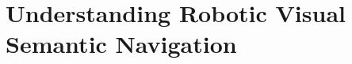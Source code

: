 \chapter{Understanding Robotic Visual Semantic Navigation}\label{ch:understanding-robotic-visual-semantic-navigation}





